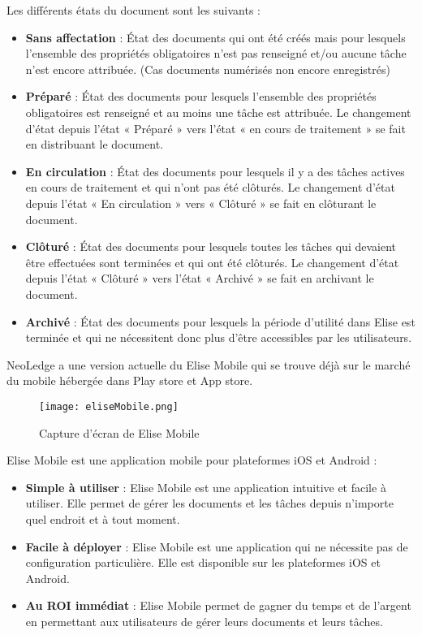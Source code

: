 Les différents états du document sont les suivants :

\begin{itemize}

\item \textbf{Sans affectation} : État des documents qui ont été créés mais pour lesquels l'ensemble des propriétés obligatoires n'est pas renseigné et/ou aucune tâche n'est encore attribuée. (Cas documents numérisés non encore enregistrés)
\item \textbf{Préparé} : État des documents pour lesquels l'ensemble des propriétés obligatoires est renseigné et au moins une tâche est attribuée. Le changement d'état depuis l'état « Préparé » vers l'état « en cours de traitement » se fait en distribuant le document.
\item \textbf{En circulation} : État des documents pour lesquels il y a des tâches actives en cours de traitement et qui n'ont pas été clôturés. Le changement d'état depuis l'état « En circulation » vers « Clôturé » se fait en clôturant le document.
\item \textbf{Clôturé} : État des documents pour lesquels toutes les tâches qui devaient être effectuées sont terminées et qui ont été clôturés. Le changement d'état depuis l'état « Clôturé » vers l'état « Archivé » se fait en archivant le document.
\item \textbf{Archivé} : État des documents pour lesquels la période d'utilité dans Elise est terminée et qui ne nécessitent donc plus d'être accessibles par les utilisateurs.

\end{itemize}

NeoLedge a une version actuelle du Elise Mobile qui se trouve déjà sur le marché du mobile hébergée dans Play store et App store.

\begin{figure}[!h]
\centering
\texttt{[image: eliseMobile.png]}
\caption{Capture d'écran de Elise Mobile}
\label{fig:captureEliseMobile}
\end{figure}

Elise Mobile est une application mobile pour plateformes iOS et Android :

\begin{itemize}
\item \textbf{Simple à utiliser} : Elise Mobile est une application intuitive et facile à utiliser. Elle permet de gérer les documents et les tâches depuis n'importe quel endroit et à tout moment.
\item \textbf{Facile à déployer} : Elise Mobile est une application qui ne nécessite pas de configuration particulière. Elle est disponible sur les plateformes iOS et Android.
\item \textbf{Au ROI immédiat} : Elise Mobile permet de gagner du temps et de l'argent en permettant aux utilisateurs de gérer leurs documents et leurs tâches.
\end{itemize}

